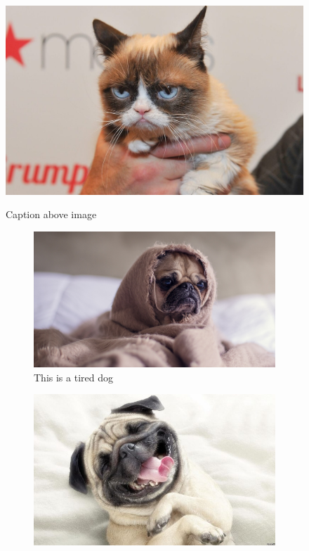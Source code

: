 \documentclass{article}
\begin{document}
                \begin{figure}[h]
                    \caption{Caption above image}
                    \includegraphics[width=0.5\linewidth]{cat.jpg}
                    \centering
                    \label{fig:cat1}
                \end{figure}
                \FloatBarrier

                \begin{figure}[h]
                    \begin{subfigure}{0.45\linewidth}
                        \centering
                        \includegraphics[width=\textwidth]{tireddog.jpg}
                        \caption{This is a tired dog}
                        \label{fig:figure1}
                    \end{subfigure}
                \hspace{0.5cm}
                    \begin{subfigure}{0.45\linewidth}
                        \centering
                        \includegraphics[width=\textwidth]{happydog.jpg}

\end{subfigure}
\end{figure}
\end{document}
